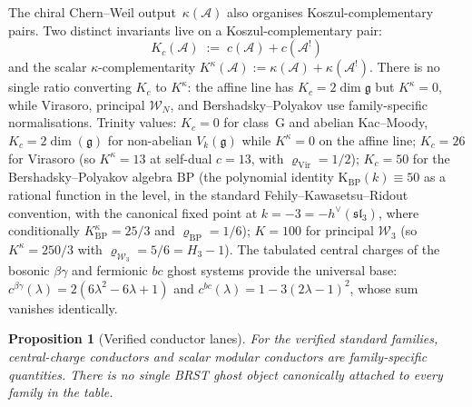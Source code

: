 \documentclass[11pt,reqno]{amsart}
\newtheorem{proposition}[theorem]{Proposition}
\theoremstyle{definition}
\theoremstyle{remark}
\newcommand{\cA}{\mathcal{A}}
\newcommand{\cW}{\mathcal{W}}
\newcommand{\fg}{\mathfrak{g}}
\numberwithin{equation}{section}
\begin{document}
The chiral Chern--Weil output~$\kappa(\cA)$ also organises
Koszul-complementary pairs. Two distinct invariants live on a
Koszul-complementary pair:
\begin{equation}\label{eq:universal-conductor}
K_c(\cA) \;:=\; c(\cA) + c(\cA^!)
\end{equation}
and the scalar $\kappa$-complementarity
$K^{\kappa}(\cA) := \kappa(\cA) + \kappa(\cA^{!})$. There is no
single ratio converting $K_c$ to $K^\kappa$: the affine
line has $K_c=2\dim\fg$ but $K^\kappa=0$, while Virasoro,
principal $\cW_N$, and Bershadsky--Polyakov use family-specific
normalisations.
	Trinity values: $K_c = 0$ for class~G and abelian Kac--Moody,
	$K_c = 2\dim(\fg)$ for non-abelian $V_k(\fg)$ while
	$K^\kappa=0$ on the affine line; $K_c = 26$ for Virasoro
	(so $K^{\kappa} = 13$ at self-dual
	$c = 13$, with $\varrho_{\mathrm{Vir}} = 1/2$); $K_c = 50$ for the
Bershadsky--Polyakov algebra $\mathrm{BP}$ (the polynomial
identity $\mathrm{K}_{\mathrm{BP}}(k) \equiv 50$ as a rational
function in the level, in the standard Fehily--Kawasetsu--Ridout
convention, with the canonical
fixed point at $k = -3 = -h^\vee(\mathfrak{sl}_3)$, where
conditionally
$K^{\kappa}_{\mathrm{BP}} = 25/3$ and $\varrho_{\mathrm{BP}} = 1/6$);
$K = 100$ for principal $\cW_3$ (so $K^{\kappa} = 250/3$ with
$\varrho_{\cW_3} = 5/6 = H_3 - 1$). The tabulated central charges of
the bosonic $\beta\gamma$ and
fermionic $bc$ ghost systems provide the universal base:
$c^{\beta\gamma}(\lambda) = 2(6\lambda^2 - 6\lambda + 1)$ and
$c^{bc}(\lambda) = 1 - 3(2\lambda - 1)^2$, whose sum vanishes
identically.

\begin{proposition}[Verified conductor lanes]
\label{thm:koszul-conductor}
For the verified standard families, central-charge conductors and
scalar modular conductors are family-specific quantities. There is no
single BRST ghost object canonically attached to every family in the
table.
\end{proposition}
\end{document}
